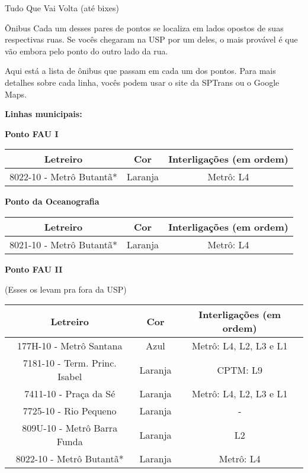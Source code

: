 \begin{secao}{Tudo Que Vai Volta (até bixes)}
\begin{subsecao}{Ônibus}
Cada um desses pares de pontos se localiza em lados opostos de suas respectivas
ruas. Se vocês chegaram na USP por um deles, o mais provável é que vão embora pelo
ponto do outro lado da rua.

Aqui está a lista de ônibus que passam em cada um dos pontos. Para mais detalhes
sobre cada linha, vocês podem usar o site da SPTrans ou o Google Maps.

{\bf Linhas municipais:}

{\bf Ponto FAU I}

\begin{center}
	\begin{tabular}{|c|c|c|}
      \hline
	  Letreiro & Cor & Interligações (em ordem)\\
	  \hline
	  8022-10 - Metrô Butantã* & Laranja & Metrô: L4\\
      \hline
	\end{tabular}
\end{center}

{\bf Ponto da Oceanografia}

\begin{center}
	\begin{tabular}{|c|c|c|}
      \hline
	  Letreiro & Cor & Interligações (em ordem)\\
	  \hline
	  8021-10 - Metrô Butantã* & Laranja & Metrô: L4\\
      \hline
	\end{tabular}
\end{center}

{\bf Ponto FAU II}

(Esses os levam pra fora da USP)
\begin{center}
	\begin{tabular}{|c|c|c|}
      \hline
	  Letreiro & Cor & Interligações (em ordem)\\
	  \hline
	  177H-10 - Metrô Santana & Azul & Metrô: L4, L2, L3 e L1\\
	  7181-10 - Term. Princ. Isabel & Laranja & CPTM: L9\\
	  7411-10 - Praça da Sé & Laranja & Metrô: L4, L2, L3 e L1\\
	  7725-10 - Rio Pequeno & Laranja & - \\
	  809U-10 - Metrô Barra Funda & Laranja & L2 \\
	  8022-10 - Metrô Butantã* & Laranja & Metrô: L4\\
      \hline
	\end{tabular}
\end{center}


\end{subsecao}
\end{secao}
